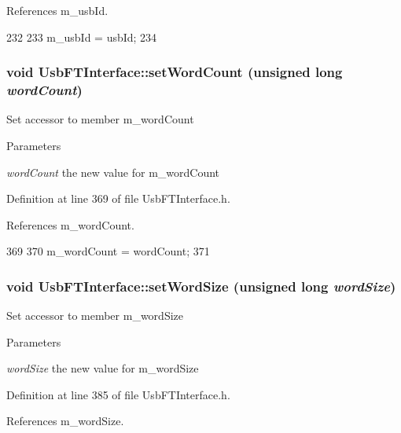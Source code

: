 References m\_\-usbId.


\begin{DoxyCode}
232                             {
233     m_usbId = usbId;
234   }
\end{DoxyCode}
\hypertarget{classUsbFTInterface_a8251b4faa76c380ea41d795482532e30}{
\subsubsection[{setWordCount}]{\setlength{\rightskip}{0pt plus 5cm}void UsbFTInterface::setWordCount (unsigned long {\em wordCount})}}
\label{classUsbFTInterface_a8251b4faa76c380ea41d795482532e30}
Set accessor to member m\_\-wordCount 
\begin{DoxyParams}{Parameters}
\item[{\em wordCount}]the new value for m\_\-wordCount \end{DoxyParams}


Definition at line 369 of file UsbFTInterface.h.

References m\_\-wordCount.


\begin{DoxyCode}
369                                               {
370     m_wordCount = wordCount;
371   }
\end{DoxyCode}
\hypertarget{classUsbFTInterface_a1666f09d2b8994f8d13d6bc66f43b530}{
\subsubsection[{setWordSize}]{\setlength{\rightskip}{0pt plus 5cm}void UsbFTInterface::setWordSize (unsigned long {\em wordSize})}}
\label{classUsbFTInterface_a1666f09d2b8994f8d13d6bc66f43b530}
Set accessor to member m\_\-wordSize 
\begin{DoxyParams}{Parameters}
\item[{\em wordSize}]the new value for m\_\-wordSize \end{DoxyParams}


Definition at line 385 of file UsbFTInterface.h.

References m\_\-wordSize.

